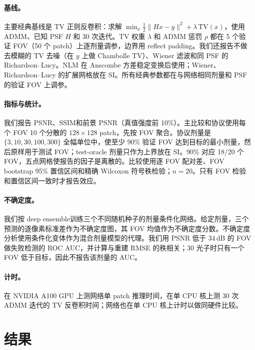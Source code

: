 \documentclass[11pt]{ctexart}
\begin{document}
\paragraph{基线。}
主要经典基线是 TV 正则反卷积：求解 $\min_x \tfrac12\|Hx-y\|^2+\lambda\,\mathrm{TV}(x)$，使用 ADMM\cite{boyd2011}、已知 PSF $H$ 和 30 次迭代。TV 权重 $\lambda$ 和 ADMM 惩罚 $\rho$ 都在 5 个验证 FOV（50 个 patch）上逐剂量调参，边界用 reflect padding。我们还报告不做去模糊的 TV 去噪（在 $y$ 上做 Chambolle TV）、Wiener 滤波和同 PSF 的 Richardson--Lucy。NLM 在 Anscombe 方差稳定变换\cite{anscombe1948,makitalo2011}后使用；Wiener、Richardson--Lucy 的扩展网格放在 SI。所有经典参数都在与网络相同剂量和 PSF 的验证 FOV 上调参。

\paragraph{指标与统计。}
我们报告 PSNR、SSIM\cite{wang2004ssim}和前景 PSNR（真值强度前 10\%）。主比较和协议使用每个 FOV 10 个分散的 $128\times128$ patch，先按 FOV 聚合。协议剂量是 $\{3,10,30,100,300\}$ 全幅单位中，使至少 90\% 验证 FOV 达到目标的最小剂量，然后原样用于测试 FOV；test-oracle 剂量只作为上界放在 SI。90\% 对应 18/20 个 FOV，五点网格使报告的因子是离散的。比较使用逐 FOV 配对差、FOV bootstrap 95\% 置信区间和精确 Wilcoxon 符号秩检验；$n=20$。只有 FOV 检验和置信区间一致时才报告效应。

\paragraph{不确定度。}
我们按 deep ensemble\cite{lakshminarayanan2017ensembles}训练三个不同随机种子的剂量条件化网络。给定剂量，三个预测的逐像素标准差作为不确定度图，其 FOV 均值作为不确定度分数。不确定度分析使用条件化变体作为混合剂量模型的代理。我们用 PSNR 低于 34\,dB 的 FOV 做失败检测的 ROC AUC，并计算与重建 RMSE 的秩相关；30 光子时只有一个 FOV 低于目标，因此不报告该剂量的 AUC。

\paragraph{计时。}
在 NVIDIA A100 GPU 上测网络单 patch 推理时间，在单 CPU 核上测 30 次 ADMM 迭代的 TV 反卷积时间；网络也在单 CPU 核上计时以做同硬件比较。

\section{结果}
\end{document}

